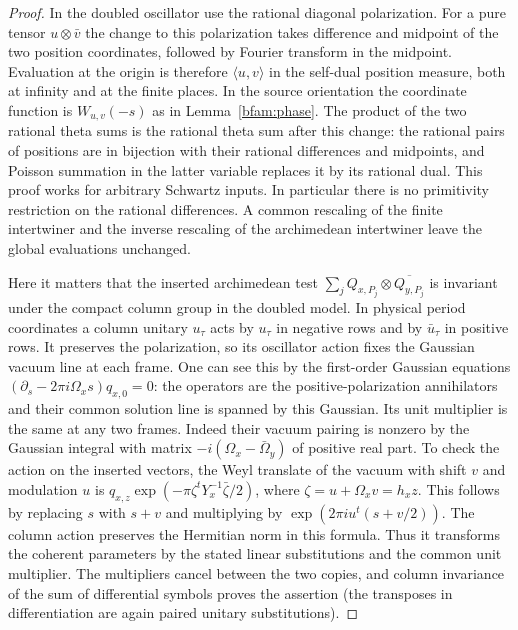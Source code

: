 \begin{proof}
In the doubled oscillator use the rational diagonal polarization.
For a pure tensor $u\otimes\bar v$ the change to this polarization
takes difference and midpoint of the two position coordinates,
followed by Fourier transform in the midpoint. Evaluation at the
origin is therefore $\langle u,v\rangle$ in the self-dual position
measure, both at infinity and at the finite places. In the source
orientation the coordinate function is $W_{u,v}(-s)$ as in
Lemma~\ref{bfam:phase}. The product of the two rational theta sums
is the rational theta sum after this change: the rational pairs of
positions are in bijection with their rational differences and
midpoints, and Poisson summation in the latter variable replaces
it by its rational dual. This proof works for arbitrary Schwartz
inputs. In particular there is no primitivity restriction on the
rational differences. A common rescaling of the finite intertwiner
and the inverse rescaling of the archimedean intertwiner leave the
global evaluations unchanged.

Here it matters that the inserted archimedean test
$\sum_j Q_{x,P_j}\otimes\overline{Q_{y,P_j}}$ is invariant under the
compact column group in the doubled model. In physical period
coordinates a column unitary $u_\tau$ acts by $u_\tau$ in negative
rows and by $\bar u_\tau$ in positive rows. It preserves the
polarization, so its oscillator action fixes the Gaussian vacuum
line at each frame. One can see this by the first-order Gaussian
equations $(\partial_s-2\pi i\Omega_xs)q_{x,0}=0$: the operators
are the positive-polarization annihilators and their common solution
line is spanned by this Gaussian. Its unit multiplier is the same
at any two frames. Indeed their vacuum pairing is nonzero by the
Gaussian integral with matrix $-i(\Omega_x-\bar\Omega_y)$ of
positive real part. To check the action on the inserted vectors,
the Weyl translate of the vacuum with shift $v$ and modulation $u$
is $q_{x,z}\exp(-\pi\zeta^tY_x^{-1}\bar\zeta/2)$, where
$\zeta=u+\Omega_xv=h_xz$. This follows by replacing $s$ with $s+v$
and multiplying by $\exp(2\pi i u^t(s+v/2))$. The column action
preserves the Hermitian norm in this formula. Thus it transforms
the coherent parameters by the stated linear substitutions and the
common unit multiplier. The multipliers cancel between the two
copies, and column invariance of the sum of differential symbols
proves the assertion (the transposes in differentiation are again
paired unitary substitutions).


\end{proof}

